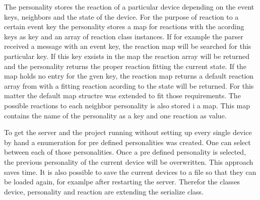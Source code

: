 The personality stores the reaction of a particular device depending on the
event keys, neighbors and the state of the device. For the purpose of reaction
to a certain event key the personality stores
a map for reactions with the acording keys as key and an array of reaction class
instances. If for example the parser received a message with an event key, the
reaction map will be searched for this particular key. If this key exsists in
the map the reaction array will be returned and the personality returns the
proper reaction fitting the current state. If the map holds no entry for the
gven key, the reaction map returns a default reaction array from with a fitting
reaction acording to the state will be returned. For this matter the default
map structre was extended to fit those requirements.
The possible reactions to each neighbor personality is also stored i a map. This
map contains the name of the personality as a key and one reaction as value. 

To get the server and the project running without setting up every single device
by hand a enumeration for pre defined personalities was created. One can select
between each of those personalities. Once a pre defined personality is selected,
the previous personality of the current device will be overwritten. This
approach saves time. It is also possible to save the current devices to a file
so that they can be loaded again, for examlpe after restarting the server.
Therefor the classes device, personality and reaction are extending the
serialize class.

